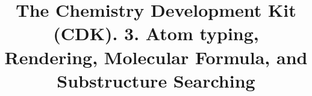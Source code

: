 \documentclass[10pt]{bmcart}
\begin{document}
\begin{frontmatter}

\begin{fmbox}

\title{The Chemistry Development Kit (CDK). 3. Atom typing, Rendering, Molecular Formula, and Substructure Searching}


\author[
   addressref={um},                   %
   email={egon.willighagen@maastrichtuniversity.nl}   %
]{ }
\author[
   addressref={aff2},
   email={john@nextmovesoftware.com}
]{ }
\author[
   addressref={uppsala},
   email={jonathan.alvarsson@farmbio.uu.se}
]{ }
\author[
   addressref={uppsala},
   email={berg.arvid@gmail.com}
]{ }
\author[
   addressref={jena},
   email={kai.duehrkop@uni-jena.de}
]{ }
\author[
   addressref={idea},
   email={jeliazkova.nina@gmail.com}
]{ }
\author[
   addressref={leicester},
   email={shk12@le.ac.uk}
]{ }
\author[
   addressref={wi_mit},
   email={pluskal@wi.mit.edu}
]{~}
\author[
   addressref={???},
   email={miguelrojasch@googlemail.com}
]{~}
\author[
   addressref={uppsala},
   email={ola.spjuth@farmbio.uu.se}
]{ }
\author[
   addressref={um},
   email={chris.evelo@maastrichtuniversity.nl}
]{ }
\author[
   addressref={nih},
   email={guhar@mail.nih.gov}
]{ }
\author[
   addressref={ebi},
   email={steinbeck@ebi.ac.uk}
]{~}


\end{fmbox}
\end{frontmatter}
\end{document}
